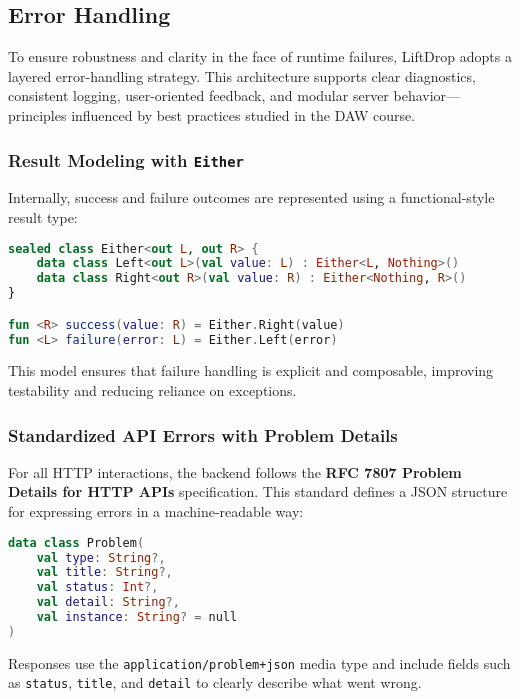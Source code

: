 \subsection{Error Handling}

To ensure robustness and clarity in the face of runtime failures, LiftDrop adopts a layered error-handling strategy. This architecture supports clear diagnostics, consistent logging, user-oriented feedback, and modular server behavior—principles influenced by best practices studied in the DAW course.

\subsubsection{Result Modeling with \texttt{Either}}

Internally, success and failure outcomes are represented using a functional-style result type:

\begin{lstlisting}[language=Kotlin, caption={Functional Result Modeling with Either}]
sealed class Either<out L, out R> {
    data class Left<out L>(val value: L) : Either<L, Nothing>()
    data class Right<out R>(val value: R) : Either<Nothing, R>()
}

fun <R> success(value: R) = Either.Right(value)
fun <L> failure(error: L) = Either.Left(error)
\end{lstlisting}

This model ensures that failure handling is explicit and composable, improving testability and reducing reliance on exceptions.

\newpage

\subsubsection{Standardized API Errors with Problem Details}

For all HTTP interactions, the backend follows the \textbf{RFC 7807 Problem Details for HTTP APIs} specification. This standard defines a JSON structure for expressing errors in a machine-readable way:

\begin{lstlisting}[language=Kotlin, caption={Problem Details Model}]
data class Problem(
    val type: String?,
    val title: String?,
    val status: Int?,
    val detail: String?,
    val instance: String? = null
)
\end{lstlisting}

Responses use the \texttt{application/problem+json} media type and include fields such as \texttt{status}, \texttt{title}, and \texttt{detail} to clearly describe what went wrong.

